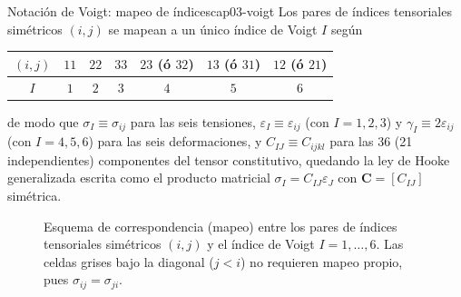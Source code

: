 \begin{ecnimportante}{Notación de Voigt: mapeo de índices}{cap03-voigt}
Los pares de índices tensoriales simétricos $(i,j)$ se mapean a un único índice de Voigt $I$ según
\begin{center}
\begin{tabular}{@{}ccccccc@{}}
\toprule
$(i,j)$ & $11$ & $22$ & $33$ & $23$ (ó $32$) & $13$ (ó $31$) & $12$ (ó $21$) \\
\midrule
$I$ & $1$ & $2$ & $3$ & $4$ & $5$ & $6$ \\
\bottomrule
\end{tabular}
\end{center}
de modo que $\sigma_I \equiv \sigma_{ij}$ para las seis tensiones, $\varepsilon_I \equiv \varepsilon_{ij}$ (con $I=1,2,3$) y $\gamma_I \equiv 2\varepsilon_{ij}$ (con $I=4,5,6$) para las seis deformaciones, y $C_{IJ}\equiv C_{ijkl}$ para las 36 (21 independientes) componentes del tensor constitutivo, quedando la ley de Hooke generalizada escrita como el producto matricial $\sigma_I = C_{IJ}\varepsilon_J$ con $\bm C=[C_{IJ}]$ simétrica.
\end{ecnimportante}

\begin{figure}[htbp]
\centering
{}
\caption{Esquema de correspondencia (mapeo) entre los pares de índices tensoriales simétricos $(i,j)$ y el índice de Voigt $I=1,\dots,6$. Las celdas grises bajo la diagonal ($j<i$) no requieren mapeo propio, pues $\sigma_{ij}=\sigma_{ji}$.}
\label{fig:cap03-mapeo-voigt}
\end{figure}

